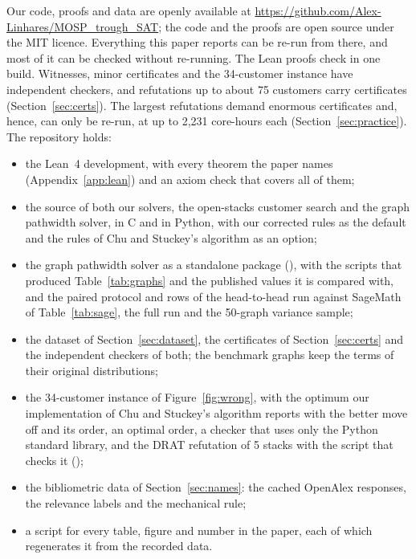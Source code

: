 Our code, proofs and data are openly available at
\url{https://github.com/Alex-Linhares/MOSP_trough_SAT}; the code and the proofs
are open source under the MIT licence. Everything this paper reports can be
re-run from there, and most of it can be checked
without re-running. The Lean proofs check in one build. Witnesses, minor
certificates and the 34-customer instance have independent checkers, and
refutations up to about 75 customers carry certificates
(Section~\ref{sec:certs}). The largest refutations demand enormous certificates and, hence, can only be
re-run, at up to 2,231 core-hours each
(Section~\ref{sec:practice}). The repository holds:
\begin{itemize}
\item the Lean~4 development, with every theorem the paper names
  (Appendix~\ref{app:lean}) and an axiom check that covers all of them;
\item the source of both our solvers, the open-stacks customer search and the
  graph pathwidth solver, in C and in Python, with our corrected rules as the
  default and the rules of Chu and Stuckey's algorithm as an
  option;
\item the graph pathwidth solver as a standalone package
  (), with the scripts that produced
  Table~\ref{tab:graphs} and the published values it is compared with, and
  the paired protocol and rows of the head-to-head run against SageMath of
  Table~\ref{tab:sage}, the full run and the 50-graph variance sample;
\item the dataset of Section~\ref{sec:dataset}, the certificates of
  Section~\ref{sec:certs} and the independent checkers of both; the benchmark
  graphs keep the terms of their original distributions;
\item the 34-customer instance of Figure~\ref{fig:wrong}, with the optimum our
  implementation of Chu and Stuckey's algorithm reports with the better move off and
  its order, an optimal order, a checker that uses only the Python standard
  library, and the DRAT refutation of 5 stacks with the script that checks it
  ();
\item the bibliometric data of Section~\ref{sec:names}: the cached OpenAlex
  responses, the relevance labels and the mechanical rule;
\item a script for every table, figure and number in the paper, each of which
  regenerates it from the recorded data.
\end{itemize}
